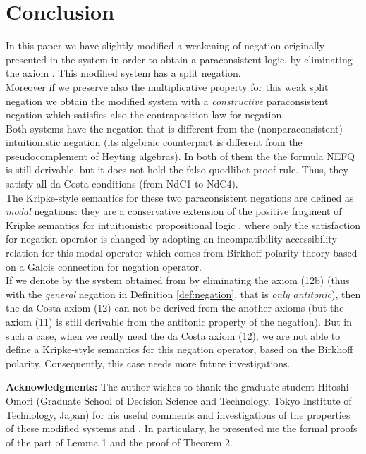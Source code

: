 \documentclass{llncs}
\begin{document}
\section{Conclusion}
In this paper we have slightly modified a weakening of negation
originally presented in the system  \cite{Majk08dc} in order to
obtain a paraconsistent logic, by eliminating the axiom . This modified system  has a split
negation.\\
Moreover if we preserve also the multiplicative property for this
weak  split negation we obtain the modified system  with a
\emph{constructive} paraconsistent negation which satisfies also the
contraposition law for negation.\\
Both systems have the negation that is different from the
(nonparaconsistent) intuitionistic negation (its algebraic
counterpart is different from the pseudocomplement of Heyting
algebras).  In both of them  the  the formula NEFQ is still
derivable, but  it does not hold the
falso quodlibet proof rule. Thus, they satisfy all da Costa conditions (from NdC1 to NdC4).\\
The Kripke-style semantics for these two paraconsistent negations
are defined as \emph{modal} negations: they are a conservative
extension of the positive fragment of Kripke semantics for
intuitionistic propositional logic \cite{Majk08dc}, where only the
satisfaction for negation operator is changed by adopting an
incompatibility accessibility relation for this modal operator which
comes from
Birkhoff polarity theory based on a Galois connection for negation operator.\\
If we denote by  the system obtained from  by
eliminating the axiom (12b) (thus with the \emph{general} negation
in Definition \ref{def:negation}, that is \emph{only antitonic}),
then the da Costa axiom (12) can not be derived from the another
axioms (but the axiom (11) is still derivable from the antitonic
property of the negation). But in such a case, when we really need
the da Costa axiom (12), we are not able to define a Kripke-style
semantics for this negation operator, based on the Birkhoff
polarity. Consequently, this case needs more future investigations.

\textbf{Acknowledgments:} The author wishes to thank the graduate
student Hitoshi Omori (Graduate School of Decision Science and
Technology, Tokyo Institute of Technology, Japan) for his useful
comments and investigations of the properties of these modified
systems  and . In particulary, he presented me the
formal proofs of the part of Lemma 1 and the proof of Theorem 2.





\end{document}
